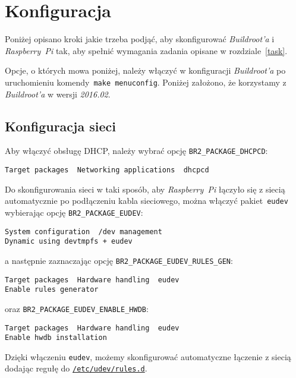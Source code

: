 \documentclass{article}
\begin{document}
\section{Konfiguracja}

Poniżej opisano kroki jakie trzeba podjąć, aby skonfigurować \emph{Buildroot'a} i \emph{Raspberry~Pi} tak, aby spełnić wymagania zadania opisane w rozdziale~\ref{task}.

Opcje, o których mowa poniżej, należy włączyć w konfiguracji \emph{Buildroot'a} po uruchomieniu komendy~\texttt{make menuconfig}. Poniżej założono, że korzystamy z \emph{Buildroot'a} w wersji \emph{2016.02}.


\subsection{Konfiguracja sieci}

Aby włączyć obsługę DHCP, należy wybrać opcję \texttt{BR2\_PACKAGE\_DHCPCD}:
\begin{center}
\texttt{Target packages \textrightarrow\ Networking applications \textrightarrow\ dhcpcd}
\end{center}

\noindent Do skonfigurowania sieci w taki sposób, aby \emph{Raspberry~Pi} łączyło się z siecią automatycznie po podłączeniu kabla sieciowego, można włączyć pakiet~\texttt{eudev} wybierając opcję \texttt{BR2\_PACKAGE\_EUDEV}:
\begin{center}
\texttt{System configuration \textrightarrow\ /dev management\ \textrightarrow\\Dynamic using devtmpfs + eudev}
\end{center}
a następnie zaznaczając opcję \texttt{BR2\_PACKAGE\_EUDEV\_RULES\_GEN}:
\begin{center}
\texttt{Target packages \textrightarrow\ Hardware handling \textrightarrow\ eudev \textrightarrow\\Enable rules generator}
\end{center}
oraz \texttt{BR2\_PACKAGE\_EUDEV\_ENABLE\_HWDB}:
\begin{center}
\texttt{Target packages \textrightarrow\ Hardware handling \textrightarrow\ eudev \textrightarrow\\Enable hwdb installation}
\end{center}

\noindent Dzięki włączeniu \texttt{eudev}, możemy skonfigurować automatyczne łączenie z siecią dodając regułę do \href{https://github.com/maximeh/buildroot/blob/master/support/scripts/mkusers}{\texttt{/etc/udev/rules.d}}.
\end{document}
